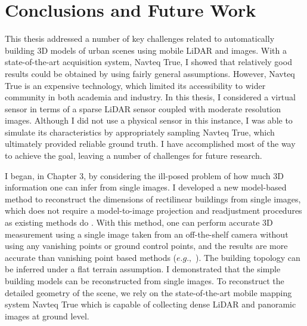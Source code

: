 \chapter{Conclusions and Future Work}

This thesis addressed a number of key challenges related to automatically building 3D models of urban scenes using mobile 
LiDAR and images. With a state-of-the-art acquisition system, Navteq True, I showed that relatively good results could be obtained by using fairly general assumptions. However, Navteq True is an expensive technology, which limited its accessibility to wider community in both academia and industry. 
In this thesis, I considered a virtual sensor in terms of a sparse LiDAR sensor coupled with moderate resolution images.  Although I did not use a physical sensor in this instance, I was able to simulate its characteristics by appropriately sampling Navteq True, which ultimately provided reliable ground truth. 
I have accomplished most of the way to achieve the goal,
leaving a number of challenges for future research.

I began, in Chapter 3, by considering the ill-posed problem of
how much 3D information one can infer from single images. I developed a new model-based method to reconstruct the dimensions of rectilinear buildings from single images, which does not require a model-to-image projection and readjustment procedures as existing methods do \cite{Lowe91, Taylor95, Debevec96}. With this method, one can perform accurate 3D measurement using a single image taken from an off-the-shelf camera without using any vanishing points or ground control points, and the results are more accurate than vanishing point based methods ($e.g.,$ \cite{ZhangZ01}). The building topology can be inferred under a flat terrain assumption. I demonstrated that the simple building models can be reconstructed from single images. To reconstruct the
detailed geometry of the scene, we rely on the state-of-the-art mobile mapping system Navteq True which is capable of
collecting dense LiDAR and panoramic images at ground
level. 

